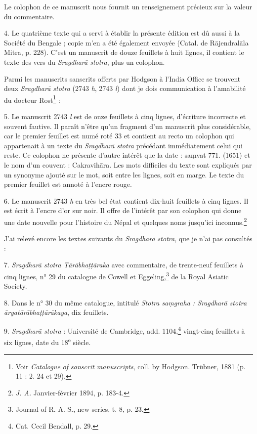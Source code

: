 \documentclass[a4paper, 11pt, oneside, french, landscape, twocolumn]{article}
\begin{document}
Le colophon de ce manuscrit nous fournit un renseignement précieux sur la valeur du commentaire.

4. Le quatrième texte qui a servi à établir la présente édition est dû aussi à la Société du Bengale ; copie m'en a été également envoyée (Catal. de R\={a}jendral\={a}la Mitra, p. 228). C'est un manuscrit de douze feuillets à huit lignes, il contient le texte des vers du \emph{Sragdhar\={a} stotra}, plus un colophon.

Parmi les manuscrits sanscrits offerts par Hodgson à l'India Office se trouvent deux \emph{Sragdhar\={a} stotra} (2743 \emph{h}, 2743 \emph{l}) dont je dois communication à l'amabilité du docteur Rost\footnote{Voir \emph{Catalogue of sanscrit manuscripts}, coll. by Hodgson. Trübner, 1881 (p. 11 : 2. 24 et 29).} :

5. Le manuscrit 2743 \emph{l} est de onze feuillets à cinq lignes, d'écriture incorrecte et souvent fautive. Il paraît n'être qu'un fragment d'un manuscrit plus considérable, car le premier feuillet est numé roté 33 et contient au recto un colophon qui appartenait à un texte du \emph{Sragdhar\={a} stotra} précédant immédiatement celui qui reste. Ce colophon ne présente d'autre intérêt que la date : sa\d{m}vat 771. (1651) et le nom d'un couvent : Cakravih\={a}ra. Les mots difficiles du texte sont expliqués par un synonyme ajouté sur le mot, soit entre les lignes, soit en marge. Le texte du premier feuillet est annoté à l'encre rouge.

6. Le manuscrit 2743 \emph{h} en très bel état contient dix-huit feuillets à cinq lignes. Il est écrit à l'encre d'or sur noir. Il offre de l'intérêt par son colophon qui donne une date nouvelle pour l'histoire du Népal et quelques noms jusqu'ici inconnus.\footnote{\emph{J. A.} Janvier-février 1894, p. 183-4.}

J'ai relevé encore les textes suivants du \emph{Sragdhar\={a} stotra}, que je n'ai pas consultés :

7. \emph{Sragdhar\={a} stotra T\={a}r\={a}bha\d{t}\d{t}\={a}raka} avec commentaire, de trente-neuf feuillets à cinq lignes, n° 29 du catalogue de Cowell et Eggeling,\footnote{Journal of R. A. S., new series, t. 8, p. 23.} de la Royal Asiatic Society.

8. Dans le n° 30 du même catalogue, intitulé \emph{Stotra sa\d{m}graha : Sragdhar\={a} stotra \={a}ryat\={a}r\={a}bha\d{t}\d{t}\={a}r\={a}kaya}, dix feuillets.

9. \emph{Sragdhar\={a} stotra} : Université de Cambridge, add. 1104,\footnote{Cat. Cecil Bendall, p. 29.} vingt-cinq feuillets à six lignes, date du 18\textsuperscript{e} siècle.
\end{document}
